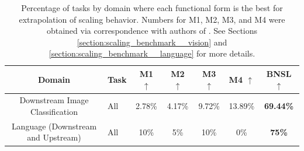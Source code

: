\documentclass{article} %
\newcommand{\highlight}[1]{\colorbox{blue!10}{#1}}
\begin{document}
\begin{table}[hbt!]
    \centering
    \begin{tabular}{ |cH|c|c|c|c|c| } 
\hline
Domain & \hspace{.9cm}Task & M1 $\uparrow$ & M2 $\uparrow$ & M3 $\uparrow$ & M4 $\uparrow$ & BNSL $\uparrow$ \\
 \hline
 
Downstream Image Classification & All & 2.78\% & 4.17\% & 9.72\% & 13.89\% & \bfseries 69.44\%\\
 Language (Downstream and Upstream) & All & 10\% & 5\% & 10\% & 0\% & \bfseries 75\%\\
 \hline
\end{tabular}
\vspace{-2.1mm}
    \caption{
    Percentage of tasks by domain where each functional form is the best for extrapolation of scaling behavior. Numbers for M1, M2, M3, and M4 were obtained via correspondence with authors of \cite{Alabdulmohsi2022revisiting}. See Sections \ref{section:scaling_benchmark__vision} and \ref{section:scaling_benchmark__language} for more details.
    }
    \label{table:scaling_laws_benchmark_dataset__summary}
\end{table}
\end{document}
